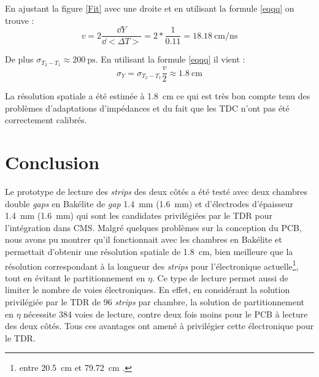 En ajustant la figure \ref{Fit} avec une droite et en utilisant la formule \ref{eqqq} on trouve :
\begin{equation}
v=2\frac{\dd Y}{\dd <\Delta T>}=2*\frac{1}{0.11}=\SI{18.18}{\centi\meter\per\nano\second}
\end{equation}

De plus $\sigma_{T_2-T_1}\approx\SI{200}{\pico\second}$. En utilisant la formule \ref{eqqq} il vient :
\begin{equation}
\sigma_{Y}=\sigma_{T_2-T_1}\frac{v}{2}\approx\SI{1.8}{\centi\meter}
\end{equation}

La résolution spatiale a été estimée à \SI{1.8}{\centi\meter} ce qui est très bon compte tenu des problèmes d'adaptations d'impédances et du fait que les TDC n'ont pas été correctement calibrés.

\section{Conclusion}
Le prototype de lecture des \textit{strips} des deux côtés a été testé avec deux chambres double \textit{gaps} en Bakélite de \textit{gap} \SI{1.4}{\milli\meter} (\SI{1.6}{\milli\meter}) et d'électrodes d'épaisseur \SI{1.4}{\milli\meter} (\SI{1.6}{\milli\meter}) qui sont les candidates privilégiées par le TDR pour l'intégration dans CMS. Malgré quelques problèmes sur la conception du PCB, nous avons pu montrer qu'il fonctionnait avec les chambres en Bakélite et permettait d'obtenir une résolution spatiale de \SI{1.8}{\centi\meter}, bien meilleure que la résolution correspondant à la longueur des \textit{strips} pour l'électronique actuelle\footnote{entre \SI{20.5}{\centi\meter} et \SI{79.72}{\centi\meter} \cite{gapss}.}, tout en évitant le partitionnement en $\eta$. Ce type de lecture permet aussi de limiter le nombre de voies électroniques. En effet, en considérant la solution privilégiée par le TDR de \num{96} \textit{strips} par chambre, la solution de partitionnement en $\eta$ nécessite \num{384} voies de lecture, contre deux fois moins pour le PCB à lecture des deux côtés. Tous ces avantages ont amené à privilégier cette électronique pour le TDR.